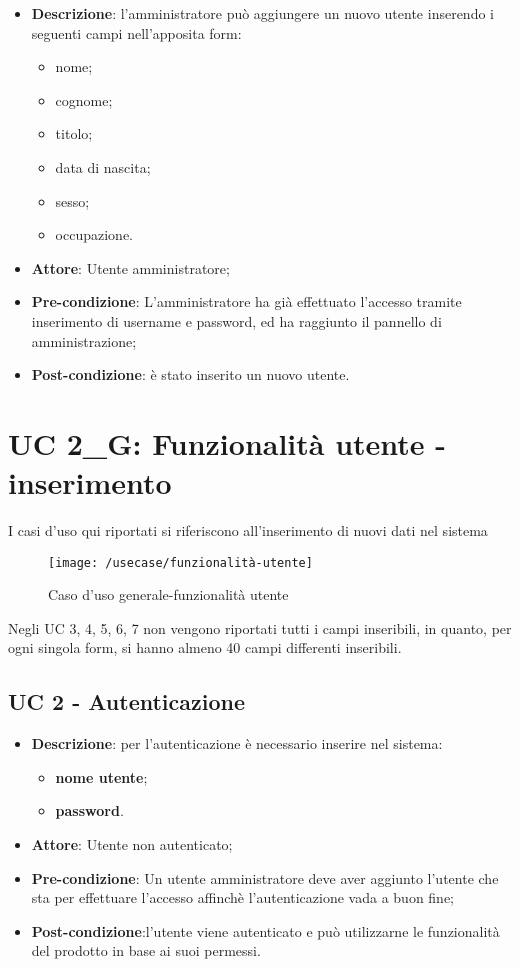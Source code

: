 \begin{itemize}
	\item \textbf{Descrizione}: l'amministratore può aggiungere un nuovo utente inserendo i seguenti campi nell'apposita form:
	\begin{itemize}
		\item nome;
		\item cognome;
		\item titolo;
		\item data di nascita;
		\item sesso;
		\item occupazione.
	\end{itemize}
	\item \textbf{Attore}: Utente amministratore;
	\item \textbf{Pre-condizione}: L'amministratore ha già effettuato l'accesso tramite inserimento di username e password, ed ha raggiunto il pannello di amministrazione;
	\item \textbf{Post-condizione}: è stato inserito un nuovo utente.
\end{itemize}

\section{UC 2\_G: Funzionalità utente - inserimento}

I casi d'uso qui riportati si riferiscono all'inserimento di nuovi dati nel sistema

\begin{figure}[h]
	\centering
	\texttt{[image: /usecase/funzionalità-utente]}
	\caption{Caso d'uso generale-funzionalità utente}
\end{figure}

Negli UC 3, 4, 5, 6, 7 non vengono riportati tutti i campi inseribili, in quanto, per ogni singola form, si hanno almeno 40 campi differenti inseribili.\\

\subsection{UC 2 - Autenticazione}

\begin{itemize}
	\item \textbf{Descrizione}: per l'autenticazione è necessario inserire nel sistema:
	\begin{itemize}
		\item \textbf{nome utente};
		\item \textbf{password}.
	\end{itemize}
	\item \textbf{Attore}: Utente non autenticato;
	\item \textbf{Pre-condizione}: Un utente amministratore deve aver aggiunto l'utente che sta per effettuare l'accesso affinchè l'autenticazione vada a buon fine;
	\item \textbf{Post-condizione}:l'utente viene autenticato e può utilizzarne le funzionalità del prodotto in base ai suoi permessi.
\end{itemize}

